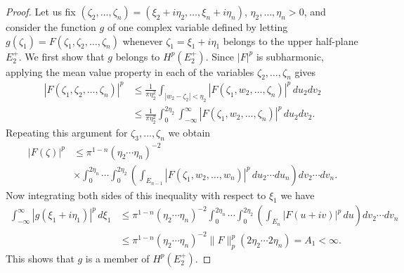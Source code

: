 \begin{proof}
Let us fix $(\zeta_2, \dots, \zeta_n) = (\xi_2 + i\eta_2, \dots, \xi_n + i\eta_n)$, $\eta_2, \dots, \eta_n > 0$, and consider the function $g$ of one complex variable defined by letting $g(\zeta_1) = F(\zeta_1, \zeta_2, \dots, \zeta_n)$ whenever $\zeta_1 = \xi_1 + i\eta_1$ belongs to the upper half-plane $E_2^+$. We first show that $g$ belongs to $H^p(E_2^+)$. Since $|F|^p$ is subharmonic, applying the mean value property in each of the variables $\zeta_2, \dots, \zeta_n$ gives
\[
\begin{aligned}
|F(\zeta_1, \zeta_2, \dots, \zeta_n)|^p &\leq \frac{1}{\pi\eta_2^2} \int_{|w_2 - \zeta_2| < \eta_2} |F(\zeta_1, w_2, \dots, \zeta_n)|^p\,du_2 dv_2 \\
&\leq \frac{1}{\pi\eta_2^2} \int_0^{2\eta_2} \int_{-\infty}^\infty |F(\zeta_1, w_2, \dots, \zeta_n)|^p\,du_2 dv_2.
\end{aligned}
\]
Repeating this argument for $\zeta_3, \dots, \zeta_n$ we obtain
\[
\begin{aligned}
|F(\zeta)|^p &\leq \pi^{1-n}(\eta_2 \cdots \eta_n)^{-2} \\
&\times \int_0^{2\eta_n} \cdots \int_0^{2\eta_2} \left(\int_{E_{n-1}} |F(\zeta_1, w_2, \dots, w_n)|^p\,du_2 \cdots du_n\right) dv_2 \cdots dv_n.
\end{aligned}
\]
Now integrating both sides of this inequality with respect to $\xi_1$ we have
\[
\begin{aligned}
\int_{-\infty}^\infty |g(\xi_1 + i\eta_1)|^p\,d\xi_1 &\leq \pi^{1-n}(\eta_2 \cdots \eta_n)^{-2} \int_0^{2\eta_n} \cdots \int_0^{2\eta_2} \left(\int_{E_n} |F(u + iv)|^p\,du\right) dv_2 \cdots dv_n \\
&\leq \pi^{1-n}(\eta_2 \cdots \eta_n)^{-2} \|F\|_p^p (2\eta_2 \cdots 2\eta_n) = A_1 < \infty.
\end{aligned}
\]
This shows that $g$ is a member of $H^p(E_2^+)$.


\end{proof}
